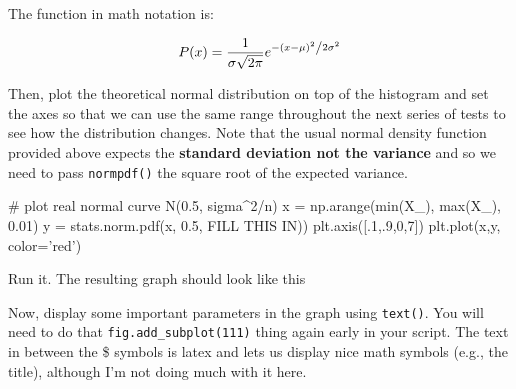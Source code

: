 \begin{fullwidth}
\noindent The function in math notation is:

\[
P(x) = \frac{1}{{\sigma \sqrt {2\pi } }}e^{{{ - \left( {x - \mu } \right)^2 } \mathord{\left/ {\vphantom {{ - \left( {x - \mu } \right)^2 } {2\sigma ^2 }}} \right. \kern-\nulldelimiterspace} {2\sigma ^2 }}}
\]

\step Then, plot the theoretical normal distribution on top of the histogram and set the axes so that we can use the same range throughout the next series of tests to see how the distribution changes. Note that the usual normal density function provided above expects the {\bf standard deviation not the variance} and so we need to pass {\tt normpdf()} the square root of the expected variance.

\begin{pyverbatim}
# plot real normal curve N(0.5, sigma^2/n)
x = np.arange(min(X_), max(X_), 0.01)
y = stats.norm.pdf(x, 0.5, FILL THIS IN))
plt.axis([.1,.9,0,7])
plt.plot(x,y, color='red')
\end{pyverbatim}

\step Run it. The resulting graph should look like this \\


\step Now, display some important parameters in the graph using {\tt text()}. You will need to do that {\tt fig.add\_subplot(111)} thing again early in your script. The text in between the \$ symbols is latex and lets us display nice math symbols (e.g., the title), although I'm not doing much with it here.


\end{fullwidth}
